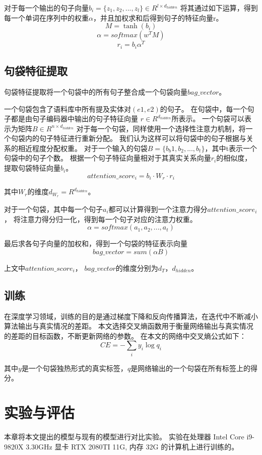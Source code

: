 \documentclass[UTF8]{csoarticle}
\begin{document}
对于每一个输出的句子向量$ b_i = \{z_1, z_2,...,z_l\} \in R^{l \times d_{hidden}} $
将其通过如下运算，得到每一个单词在序列中的权重$\alpha$，并且加权求和后得到句子的特征向量r。
\[ M= \tanh(b_i) \]
\[ \alpha = softmax(w^T M) \]
\[ r_i = b_i \alpha^T \]

\subsection{句袋特征提取}
句袋特征提取将一个句袋中的所有句子整合成一个句袋向量$bag\_vector$。

一个句袋包含了语料库中所有提及实体对$(e1, e2)$的句子。
在句袋中，每一个句子都是由句子编码器中输出的句子特征向量 $r \in R^{d_{hidden}}$所表示。
一个句袋可以表示为矩阵$B \in R^{n \times d_{hidden}}$
对于每一个句袋，同样使用一个选择性注意力机制，将一个句袋内的句子特征进行重新分配。
我们认为这样可以将句袋中的句子根据与关系的相近程度分配权重。
对于一个输入的句袋$B = \{b_b1, b_2,...,b_t\}$，其中t表示一个句袋中的句子个数。
根据一个句子特征向量相对于其真实关系向量$r_i$的相似度，提取句袋特征向量$b_i$。
\[attention\_score_i =  b_i\cdot W_r \cdot r_i\]

其中$W_r$的维度$d_{W_r} = R^{d_{hidden}}$。

对于一个句袋，其中每一个句子$a_i$都可以计算得到一个注意力得分$attention\_score_i$，
将注意力得分归一化，得到每一个句子对应的注意力权重。
\[\alpha = softmax({a_1,a_2,...,a_t})\]

最后求各句子向量的加权和，得到一个句袋的特征表示向量
\[bag\_vector = sum(\alpha  B)\]

上文中$attention\_score_i$， $bag\_vector$的维度分别为$d_T$，$d_{hidden}$。

\subsection{训练}
在深度学习领域，训练的目的是通过梯度下降和反向传播算法，在迭代中不断减小算法输出与真实情况的差距。
本文选择交叉熵函数用于衡量网络输出与真实情况的差距的目标函数，不断更新网络的参数。
在本文的网络中交叉熵公式如下：
\[ CE =-\sum _{i}y_i \log q_i\]

其中$y$是一个句袋独热形式的真实标签，$q$是网络输出的一个句袋在所有标签上的得分。
\section{实验与评估}
本章将本文提出的模型与现有的模型进行对比实验。
实验在处理器 Intel Core i9-9820X 3.30GHz 显卡 RTX 2080TI 11G, 内存 32G 的计算机上进行训练的。
\end{document}
